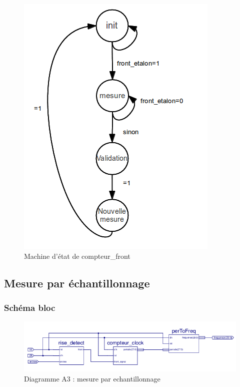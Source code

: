 \documentclass[a4paper,11pt]{article}
\begin{document}
\begin{figure}[H]
\begin{center}
	\includegraphics[scale=.6]{machine_mesureEtalon.png}
	\caption{Machine d'état de compteur\_front}
\end{center}
\end{figure}


  \subsection{Mesure par échantillonnage}
  \subsubsection{Schéma bloc}
  
  \begin{figure}[H]
\begin{center}
	\includegraphics[scale=1]{sch-echantillon.png}
	\caption{Diagramme A3 : mesure par echantillonnage}
\end{center}
\end{figure}
\end{document}
